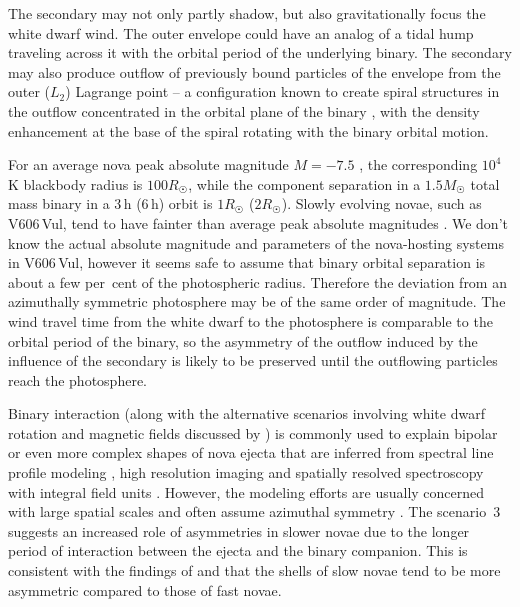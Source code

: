 \documentclass[twocolumn]{aastex631}
\newcommand{\nova}{V606\,Vul}
\begin{document}
The secondary may not only partly shadow, but also gravitationally focus 
the white dwarf wind. 
The outer envelope could have an analog of a tidal hump traveling across 
it with the orbital period of the underlying binary. 
The secondary may also produce outflow of previously bound particles of the
envelope from the outer ($L_2$) Lagrange point \citep{2019MNRAS.489..891H} -- a configuration
known to create spiral structures in the outflow concentrated in the orbital
plane of the binary \citep[e.g.,][]{2016MNRAS.455.4351P,2022MNRAS.513.4405A},
with the density enhancement at the base of the spiral rotating with the binary orbital motion.

For an average nova peak absolute magnitude $M = -7.5$
\citep{2022MNRAS.517.6150S}, the corresponding $10^4$\,K blackbody radius is 
$100 R_\Sun$, while the component separation in a $1.5 M_\Sun$ total mass
binary in a 3\,h (6\,h) orbit is $1 R_\Sun$ ($2 R_\Sun$). 
Slowly evolving novae, such as \nova{}, tend to have fainter than average peak absolute magnitudes \citep{2023RNAAS...7..191S}.
%
We don't know the actual absolute magnitude and parameters of the nova-hosting systems in \nova{}, 
however it seems safe to assume that binary orbital separation is about a few per~cent of the photospheric radius. 
Therefore the deviation from an azimuthally symmetric photosphere may be of the same
order of magnitude. The wind travel time from the white
dwarf to the photosphere is comparable to the orbital period of the binary,
so the asymmetry of the outflow induced by the influence of the secondary 
is likely to be preserved until the outflowing particles reach the photosphere.

Binary interaction (along with the alternative scenarios involving white
dwarf rotation and magnetic fields discussed by \citealt{2011A&A...536A..97F}) 
is commonly used to explain bipolar or even more complex
shapes of nova ejecta that are inferred from spectral line profile modeling 
\citep[e.g.,][]{2019ApJ...872..120K,2022ApJ...932...39N,2023MNRAS.521.4750H}, 
high resolution imaging \citep{2014Natur.514..339C,2021MNRAS.501.1394N,2022A&A...666L...6M} and 
spatially resolved spectroscopy with integral field units 
\citep[e.g.,][]{2009ApJ...706..738W,2022MNRAS.511.1591T,2022MNRAS.517.2567S}.
However, the modeling efforts are usually concerned with large
spatial scales and often assume azimuthal symmetry
\citep{1990ApJ...356..250L,1997MNRAS.284..137L}. 
The scenario~3 suggests an increased role of asymmetries in slower novae 
due to the longer period of interaction between the
ejecta and the binary companion. This is consistent with the findings of
\cite{1995MNRAS.276..353S} and \cite{2022MNRAS.512.2003S} that the shells of slow novae 
tend to be more asymmetric compared to those of fast novae.
\end{document}
